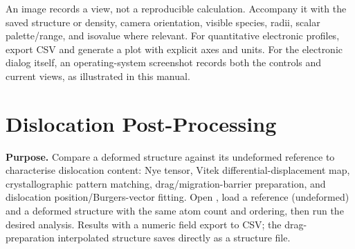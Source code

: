 An image records a view, not a reproducible calculation. Accompany it with the saved structure or density, camera orientation, visible species, radii, scalar palette/range, and isovalue where relevant. For quantitative electronic profiles, export CSV and generate a plot with explicit axes and units. For the electronic dialog itself, an operating-system screenshot records both the controls and current views, as illustrated in this manual.

\section{Dislocation Post-Processing}\label{sec:dislocation-postprocessing}
\textbf{Purpose.} Compare a deformed structure against its undeformed reference to characterise dislocation content: Nye tensor, Vitek differential-displacement map, crystallographic pattern matching, drag/migration-barrier preparation, and dislocation position/Burgers-vector fitting. Open , load a reference (undeformed) and a deformed structure with the same atom count and ordering, then run the desired analysis. Results with a numeric field export to CSV; the drag-preparation interpolated structure saves directly as a structure file.

